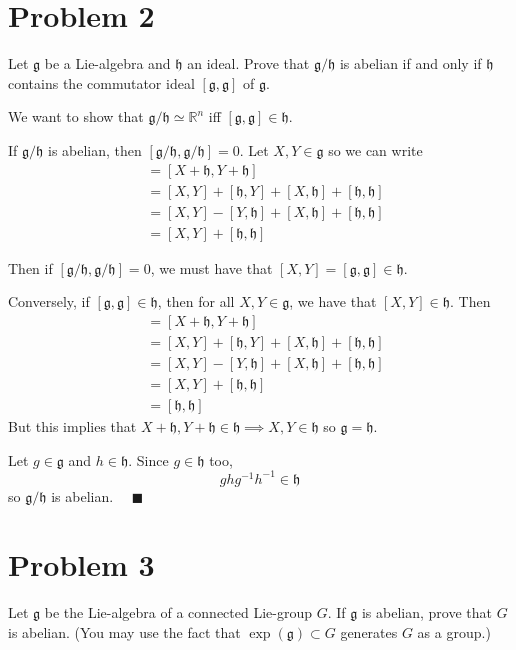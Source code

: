 \documentclass[12pt]{article}
\newcommand{\R}{\mathbb{R}}
\newcommand{\qed}{\quad \blacksquare}
\newcommand{\g}{\mathfrak{g}}
\newcommand{\h}{\mathfrak{h}}
\begin{document}
        \color{black}
\pagebreak

\section*{Problem 2} 
Let $\g$ be a Lie-algebra and $\h$ an ideal. Prove that $\g/\h$ is abelian if and only if $\h$ contains the commutator ideal $[\g,\g]$ of $\g$.  

    \color{blue}
        We want to show that $\g/\h \simeq \R^n$ iff $[\g, \g] \in \h$.  

        If $\g/\h$ is abelian, then $[\g/\h, \g/\h] = 0$. Let $X, Y \in \g$ so we can write 
        \begin{align*}
            [\g/\h, \g/\h] &= [X + \h, Y + \h]\\ 
                &= [X, Y] + [\h, Y] + [X, \h] + [\h, \h]\\ 
                &= [X, Y] - [Y, \h] + [X, \h] + [\h, \h]\\ 
                &= [X, Y] + [\h, \h]
        \end{align*}
    
        Then if $[\g/\h, \g/\h] = 0$, we must have that $[X, Y] = [\g, \g] \in \h$.

        Conversely, if $[\g, \g] \in \h$, then for all $X, Y \in \g$, we have that $[X, Y] \in \h$. Then
        \begin{align*}
            [\g/\h, \g/\h] &= [X + \h, Y + \h]\\ 
                &= [X, Y] + [\h, Y] + [X, \h] + [\h, \h]\\ 
                &= [X, Y] - [Y, \h] + [X, \h] + [\h, \h]\\ 
                &= [X, Y] + [\h, \h]\\ 
                &= [\h, \h]
        \end{align*}
        But this implies that $X + \h, Y + \h \in \h \implies X, Y \in \h$ so $\g = \h$. 

        Let $g \in \g$ and $h \in \h$. Since $g \in \h$ too,  
        \[ghg^{-1}h^{-1} \in \h\] 
        so $\g/\h$ is abelian. $\qed$
    \color{black}
\pagebreak


\section*{Problem 3}
Let $\g$ be the Lie-algebra of a connected Lie-group $G$. If $\g$ is abelian, prove that $G$ is abelian.  (You may use the fact that $\exp(\g) \subset G$ generates $G$ as a group.)
\end{document}
